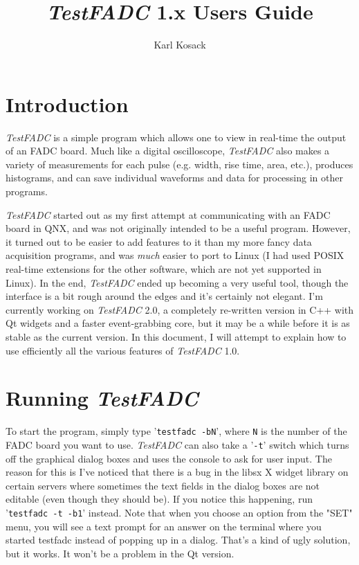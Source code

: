 \documentclass{article}
\newcommand{\F}[1]{\texttt{#1}}
\newcommand{\testfadc}{\emph{TestFADC} }
\begin{document}
  \title{\testfadc 1.x Users Guide}
  \author{Karl Kosack}
  \maketitle
  \tableofcontents
  \newpage

\section{Introduction}

\testfadc is a simple program which allows one to view in real-time the
output of an FADC board.  Much like a digital oscilloscope,
\testfadc also makes a variety of measurements for each pulse
(e.g. width, rise time, area, etc.), produces histograms, and can save
individual waveforms and data for processing in other programs.

\testfadc started out as my first attempt at communicating with an
FADC board in QNX, and was not originally intended to be a useful
program.  However, it turned out to be easier to add features to it
than my more fancy data acquisition programs, and was \emph{much}
easier to port to Linux (I had used POSIX real-time extensions for the
other software, which are not yet supported in Linux).  In the end,
\testfadc ended up becoming a very useful tool, though the interface
is a bit rough around the edges and it's certainly not elegant. I'm
currently working on \testfadc 2.0, a completely re-written version in
C++ with Qt widgets and a faster event-grabbing core, but it may be a
while before it is as stable as the current version.  In this
document, I will attempt to explain how to use efficiently all the
various features of \testfadc 1.0.

\section{Running \testfadc}

To start the program, simply type '\F{testfadc -bN}', where \F{N} is
the number of the FADC board you want to use.  \testfadc can also take
a '\F{-t}' switch which turns off the graphical dialog boxes and uses
the console to ask for user input.  The reason for this is I've
noticed that there is a bug in the libsx X widget library on certain
servers where sometimes the text fields in the dialog boxes are not
editable (even though they should be). If you notice this happening,
run '\F{testfadc -t -b1}' instead. Note that when you choose an option
from the "SET" menu, you will see a text prompt for an answer on the
terminal where you started testfadc instead of popping up in a
dialog. That's a kind of ugly solution, but it works.  It won't be a
problem in the Qt version.
\end{document}
